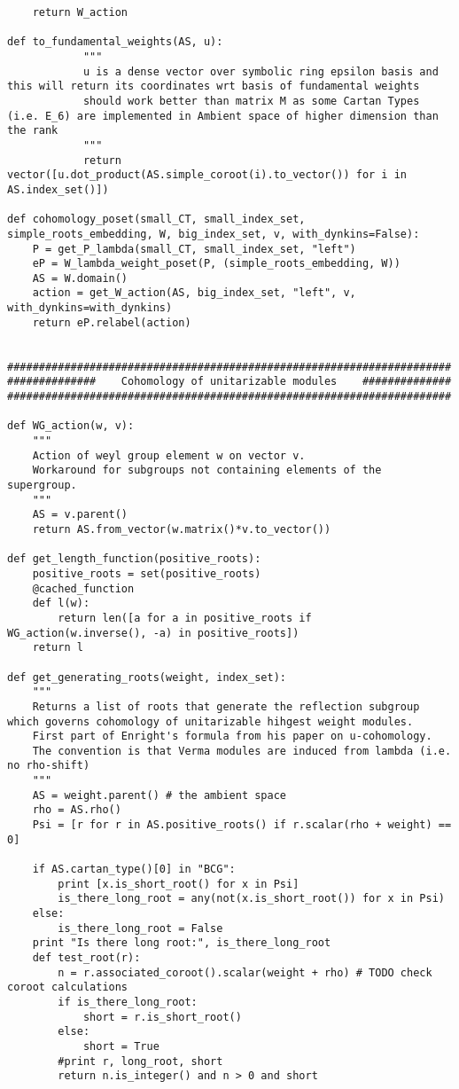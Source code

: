 \begin{verbatim}
    return W_action

def to_fundamental_weights(AS, u):
            """
            u is a dense vector over symbolic ring epsilon basis and this will return its coordinates wrt basis of fundamental weights
            should work better than matrix M as some Cartan Types (i.e. E_6) are implemented in Ambient space of higher dimension than the rank
            """
            return vector([u.dot_product(AS.simple_coroot(i).to_vector()) for i in AS.index_set()])

def cohomology_poset(small_CT, small_index_set, simple_roots_embedding, W, big_index_set, v, with_dynkins=False):
    P = get_P_lambda(small_CT, small_index_set, "left")
    eP = W_lambda_weight_poset(P, (simple_roots_embedding, W))
    AS = W.domain()
    action = get_W_action(AS, big_index_set, "left", v, with_dynkins=with_dynkins)
    return eP.relabel(action)


######################################################################
##############    Cohomology of unitarizable modules    ##############
######################################################################

def WG_action(w, v):
    """
    Action of weyl group element w on vector v.
    Workaround for subgroups not containing elements of the supergroup.
    """
    AS = v.parent()
    return AS.from_vector(w.matrix()*v.to_vector())

def get_length_function(positive_roots):
    positive_roots = set(positive_roots)
    @cached_function
    def l(w):
        return len([a for a in positive_roots if WG_action(w.inverse(), -a) in positive_roots])
    return l

def get_generating_roots(weight, index_set):
    """
    Returns a list of roots that generate the reflection subgroup which governs cohomology of unitarizable hihgest weight modules.
    First part of Enright's formula from his paper on u-cohomology.
    The convention is that Verma modules are induced from lambda (i.e. no rho-shift)
    """
    AS = weight.parent() # the ambient space
    rho = AS.rho()
    Psi = [r for r in AS.positive_roots() if r.scalar(rho + weight) == 0]

    if AS.cartan_type()[0] in "BCG":
        print [x.is_short_root() for x in Psi]
        is_there_long_root = any(not(x.is_short_root()) for x in Psi)
    else:
        is_there_long_root = False
    print "Is there long root:", is_there_long_root
    def test_root(r):
        n = r.associated_coroot().scalar(weight + rho) # TODO check coroot calculations
        if is_there_long_root:
            short = r.is_short_root()
        else:
            short = True
        #print r, long_root, short
        return n.is_integer() and n > 0 and short


\end{verbatim}
